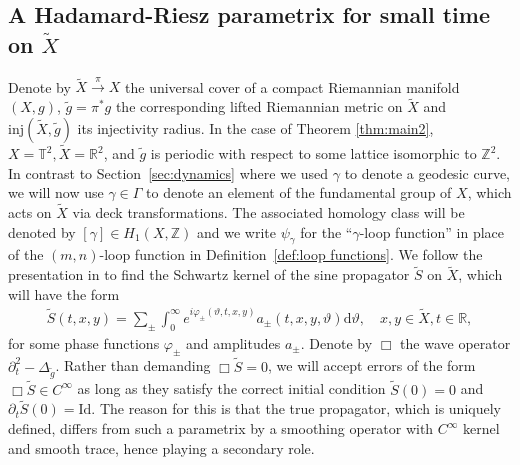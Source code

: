 \documentclass[11pt,letterpaper,oneside]{amsart}
\newcommand{\Z}{\mathbb{Z}}
\newcommand{\R}{\mathbb{R}}
\newcommand{\T}{\mathbb{T}}
\newcommand{\Id}{\text{Id}}
\newcommand{\inj}{\text{inj}}
\renewcommand{\phi}{\varphi}
\renewcommand{\theta}{\vartheta}
\theoremstyle{definition}
\theoremstyle{remark}
\newcommand{\wt}{\widetilde}
\renewcommand{\d}{\partial}
\theoremstyle{definition}
\theoremstyle{remark}
\newcommand{\dif}{\mathrm{d}}
\begin{document}
\subsection{A Hadamard-Riesz parametrix for small time on $\wt X$}
Denote by $\wt X \xrightarrow{\pi} X$ the universal cover of a compact Riemannian manifold $(X, g)$, $\wt g = \pi^* g$ the corresponding lifted Riemannian metric on $\wt X$ and $\inj(\wt X, \wt g)$ its injectivity radius. In the case of Theorem \ref{thm:main2}, $X = \T^2, \wt X = \R^2$, and $\wt g$ is periodic with respect to some lattice isomorphic to $\Z^2$. In contrast to Section~\ref{sec:dynamics} where we used $\gamma$ to denote a geodesic curve, we will now use $\gamma \in \Gamma$ to denote an element of the fundamental group of $X$, which acts on $\wt X$ via deck transformations. The associated homology class will be denoted by $[\gamma] \in H_1(X, \Z)$ and we write $\psi_\gamma$ for the ``$\gamma$-loop function'' in place of the $(m,n)$-loop function in Definition~\ref{def:loop functions}. We follow the presentation in \cite{Berard77} to find the Schwartz kernel of the sine propagator $\wt S$ on $\wt X$, which will have the form
\begin{align}\label{kernel}
    \wt S(t,x,y) = \sum_\pm \int_0^\infty e^{i \phi_\pm(\theta, t,x,y)} a_\pm (t,x,y,\theta) \dif \theta, \quad x,y \in \wt X, t \in \R,
\end{align}
for some phase functions $\phi_\pm$ and amplitudes $a_{\pm}$. Denote by $\Box$ the wave operator $\d_t^2 - \Delta_{\wt g}$. Rather than demanding $\Box \wt S = 0$, we will accept errors of the form $\Box \wt S \in C^\infty$ as long as they satisfy the correct initial condition $\wt S(0) = 0$ and $\d_t \wt S(0) = \Id$. The reason for this is that the true propagator, which is uniquely defined, differs from such a parametrix by a smoothing operator with $C^\infty$ kernel and smooth trace, hence playing a secondary role.

\medskip
\end{document}
